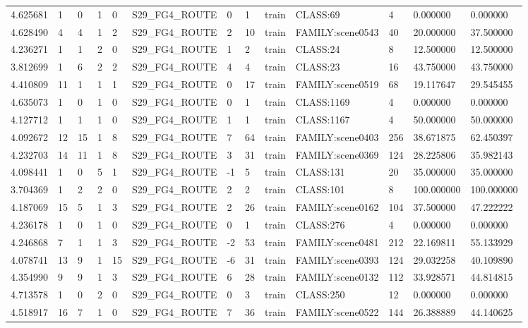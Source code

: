 \begin{tabular}{lllllllllllll}
4.625681 & 1 & 0 & 1 & 0 & S29\_FG4\_ROUTE & 0 & 1 & train & CLASS:69 & 4 & 0.000000 & 0.000000 \\
4.628490 & 4 & 4 & 1 & 2 & S29\_FG4\_ROUTE & 2 & 10 & train & FAMILY:scene0543 & 40 & 20.000000 & 37.500000 \\
4.236271 & 1 & 1 & 2 & 0 & S29\_FG4\_ROUTE & 1 & 2 & train & CLASS:24 & 8 & 12.500000 & 12.500000 \\
3.812699 & 1 & 6 & 2 & 2 & S29\_FG4\_ROUTE & 4 & 4 & train & CLASS:23 & 16 & 43.750000 & 43.750000 \\
4.410809 & 11 & 1 & 1 & 1 & S29\_FG4\_ROUTE & 0 & 17 & train & FAMILY:scene0519 & 68 & 19.117647 & 29.545455 \\
4.635073 & 1 & 0 & 1 & 0 & S29\_FG4\_ROUTE & 0 & 1 & train & CLASS:1169 & 4 & 0.000000 & 0.000000 \\
4.127712 & 1 & 1 & 1 & 0 & S29\_FG4\_ROUTE & 1 & 1 & train & CLASS:1167 & 4 & 50.000000 & 50.000000 \\
4.092672 & 12 & 15 & 1 & 8 & S29\_FG4\_ROUTE & 7 & 64 & train & FAMILY:scene0403 & 256 & 38.671875 & 62.450397 \\
4.232703 & 14 & 11 & 1 & 8 & S29\_FG4\_ROUTE & 3 & 31 & train & FAMILY:scene0369 & 124 & 28.225806 & 35.982143 \\
4.098441 & 1 & 0 & 5 & 1 & S29\_FG4\_ROUTE & -1 & 5 & train & CLASS:131 & 20 & 35.000000 & 35.000000 \\
3.704369 & 1 & 2 & 2 & 0 & S29\_FG4\_ROUTE & 2 & 2 & train & CLASS:101 & 8 & 100.000000 & 100.000000 \\
4.187069 & 15 & 5 & 1 & 3 & S29\_FG4\_ROUTE & 2 & 26 & train & FAMILY:scene0162 & 104 & 37.500000 & 47.222222 \\
4.236178 & 1 & 0 & 1 & 0 & S29\_FG4\_ROUTE & 0 & 1 & train & CLASS:276 & 4 & 0.000000 & 0.000000 \\
4.246868 & 7 & 1 & 1 & 3 & S29\_FG4\_ROUTE & -2 & 53 & train & FAMILY:scene0481 & 212 & 22.169811 & 55.133929 \\
4.078741 & 13 & 9 & 1 & 15 & S29\_FG4\_ROUTE & -6 & 31 & train & FAMILY:scene0393 & 124 & 29.032258 & 40.109890 \\
4.354990 & 9 & 9 & 1 & 3 & S29\_FG4\_ROUTE & 6 & 28 & train & FAMILY:scene0132 & 112 & 33.928571 & 44.814815 \\
4.713578 & 1 & 0 & 2 & 0 & S29\_FG4\_ROUTE & 0 & 3 & train & CLASS:250 & 12 & 0.000000 & 0.000000 \\
4.518917 & 16 & 7 & 1 & 0 & S29\_FG4\_ROUTE & 7 & 36 & train & FAMILY:scene0522 & 144 & 26.388889 & 44.140625 \\

\end{tabular}
